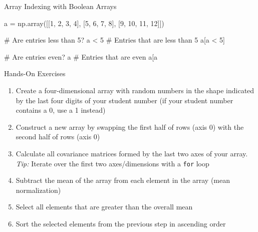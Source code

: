 \documentclass[ignorenonframetext,xcolor=x11names]{beamer}
\begin{document}
\begin{frame}[fragile]{Array Indexing with Boolean Arrays}

\begin{pythoncode}
a = np.array([[1,  2,  3,  4], 
              [5,  6,  7,  8], 
              [9, 10, 11, 12]])

# Are entries less than 5?
a < 5
# Entries that are less than 5
a[a < 5]

# Are entries even?
a%
# Entries that are even
a[a%
\end{pythoncode}
\end{frame}              

             



\begin{frame}{Hands-On Exercises}
\begin{enumerate}
   \item Create a four-dimensional array with random numbers in the shape indicated by the last four digits of your student number (if your student number contains a 0, use a 1 instead)
   \item Construct a new array by swapping the first half of rows (axis 0) with the second half of rows (axis 0)
   \item Calculate all covariance matrices formed by the last two axes of your array. \emph{Tip:} Iterate over the first two axes/dimensions with a \texttt{for} loop
   \item Subtract the mean of the array from each element in the array (mean normalization)
   \item Select all elements that are greater than the overall mean
   \item Sort the selected elements from the previous step in ascending order
\end{enumerate}
\end{frame}
\end{document}
